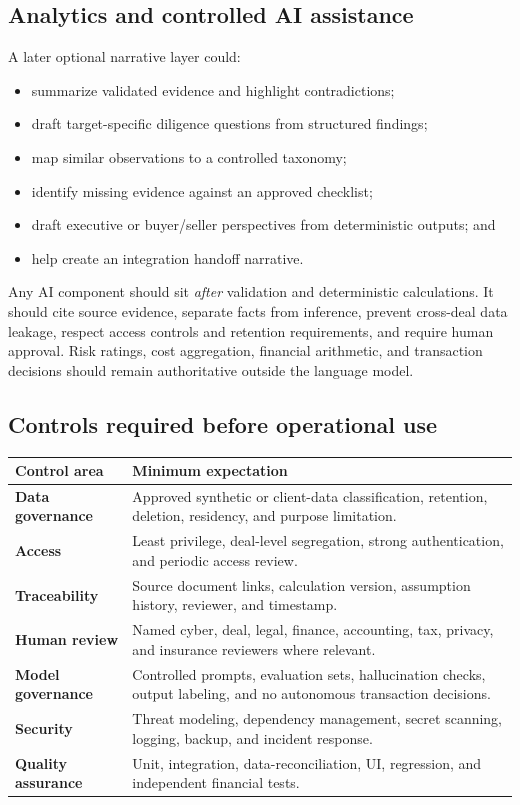 \documentclass[11pt,a4paper]{article}
\begin{document}
\subsection{Analytics and controlled AI assistance}

A later optional narrative layer could:

\begin{itemize}
  \item summarize validated evidence and highlight contradictions;
  \item draft target-specific diligence questions from structured findings;
  \item map similar observations to a controlled taxonomy;
  \item identify missing evidence against an approved checklist;
  \item draft executive or buyer/seller perspectives from deterministic outputs; and
  \item help create an integration handoff narrative.
\end{itemize}

Any AI component should sit \emph{after} validation and deterministic calculations. It should cite source evidence, separate facts from inference, prevent cross-deal data leakage, respect access controls and retention requirements, and require human approval. Risk ratings, cost aggregation, financial arithmetic, and transaction decisions should remain authoritative outside the language model.

\subsection{Controls required before operational use}

\begin{longtable}{>{\bfseries}p{}p{}}
\toprule
Control area & Minimum expectation \\
\midrule
Data governance & Approved synthetic or client-data classification, retention, deletion, residency, and purpose limitation. \\
Access & Least privilege, deal-level segregation, strong authentication, and periodic access review. \\
Traceability & Source document links, calculation version, assumption history, reviewer, and timestamp. \\
Human review & Named cyber, deal, legal, finance, accounting, tax, privacy, and insurance reviewers where relevant. \\
Model governance & Controlled prompts, evaluation sets, hallucination checks, output labeling, and no autonomous transaction decisions. \\
Security & Threat modeling, dependency management, secret scanning, logging, backup, and incident response. \\
Quality assurance & Unit, integration, data-reconciliation, UI, regression, and independent financial tests. \\
\bottomrule
\end{longtable}
\end{document}

